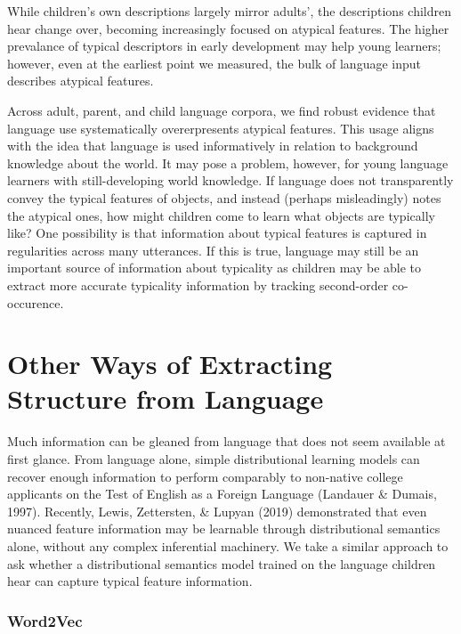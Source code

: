 \documentclass[10pt, letterpaper]{article}
\begin{document}
While children's own descriptions largely mirror adults', the
descriptions children hear change over, becoming increasingly focused on
atypical features. The higher prevalance of typical descriptors in early
development may help young learners; however, even at the earliest point
we measured, the bulk of language input describes atypical features.

Across adult, parent, and child language corpora, we find robust
evidence that language use systematically overerpresents atypical
features. This usage aligns with the idea that language is used
informatively in relation to background knowledge about the world. It
may pose a problem, however, for young language learners with
still-developing world knowledge. If language does not transparently
convey the typical features of objects, and instead (perhaps
misleadingly) notes the atypical ones, how might children come to learn
what objects are typically like? One possibility is that information
about typical features is captured in regularities across many
utterances. If this is true, language may still be an important source
of information about typicality as children may be able to extract more
accurate typicality information by tracking second-order co-occurence.

\hypertarget{other-ways-of-extracting-structure-from-language}{%
\section{Other Ways of Extracting Structure from
Language}\label{other-ways-of-extracting-structure-from-language}}

Much information can be gleaned from language that does not seem
available at first glance. From language alone, simple distributional
learning models can recover enough information to perform comparably to
non-native college applicants on the Test of English as a Foreign
Language (Landauer \& Dumais, 1997). Recently, Lewis, Zettersten, \&
Lupyan (2019) demonstrated that even nuanced feature information may be
learnable through distributional semantics alone, without any complex
inferential machinery. We take a similar approach to ask whether a
distributional semantics model trained on the language children hear can
capture typical feature information.

\hypertarget{word2vec}{%
\subsubsection{Word2Vec}\label{word2vec}}
\end{document}
